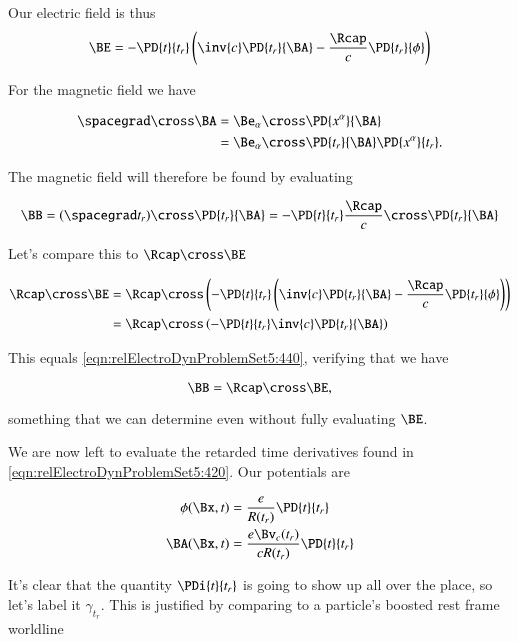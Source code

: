 Our electric field is thus
\begin{equation}\label{eqn:relElectroDynProblemSet5:420}
\BE = - \PD{t}{t_r} \left( \inv{c} \PD{t_r}{\BA} - \frac{\Rcap}{c} \PD{t_r}{\phi} \right)
\end{equation}

For the magnetic field we have

\begin{align*}
\spacegrad \cross \BA
&=
\Be_\alpha \cross \PD{x^\alpha}{\BA} \\
&=
\Be_\alpha \cross 
\PD{t_r}{\BA} \PD{x^\alpha}{t_r}.
\end{align*}

The magnetic field will therefore be found by evaluating 

\begin{equation}\label{eqn:relElectroDynProblemSet5:440}
\BB = (\spacegrad t_r) \cross \PD{t_r}{\BA} = - \PD{t}{t_r} \frac{\Rcap}{c} \cross \PD{t_r}{\BA} 
\end{equation}

Let's compare this to $\Rcap \cross \BE$ 

\begin{align*}
\Rcap \cross \BE 
&= \Rcap \cross \left( 
- \PD{t}{t_r} \left( \inv{c} \PD{t_r}{\BA} - \frac{\Rcap}{c} \PD{t_r}{\phi} \right) \right) \\
&= \Rcap \cross \left( - \PD{t}{t_r} \inv{c} \PD{t_r}{\BA} \right)
\end{align*}

This equals \ref{eqn:relElectroDynProblemSet5:440}, verifying that we have

\begin{equation}\label{eqn:relElectroDynProblemSet5:450}
\BB = \Rcap \cross \BE,
\end{equation}

something that we can determine even without fully evaluating $\BE$.

We are now left to evaluate the retarded time derivatives found in \ref{eqn:relElectroDynProblemSet5:420}.  Our potentials are

\begin{align}\label{eqn:relElectroDynProblemSet5:470}
\phi(\Bx, t) &= \frac{e}{R(t_r)} \PD{t}{t_r} \\
\BA(\Bx, t) &= \frac{e \Bv_c(t_r)}{c R(t_r)} \PD{t}{t_r}
\end{align}

It's clear that the quantity $\PDi{t}{t_r}$ is going to show up all over the place, so let's label it $\gamma_{t_r}$.  This is justified by comparing to a particle's boosted rest frame worldline

